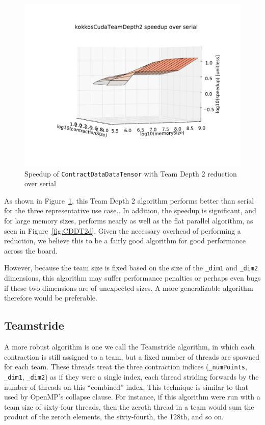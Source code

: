 \begin{figure}[ht]
    \includegraphics[width=5in]{./VersusSerial_kokkosCudaTeamDepth2_clearCache_shadowfax}
    \caption[Performance of \texttt{ContractDataDataTensor} Team Depth
    2]{Speedup of \texttt{ContractDataDataTensor} with Team Depth 2 reduction
    over serial
\label{fig:ContractDataDataTensorDepth2}} 
\end{figure}

As shown in Figure~\ref{fig:ContractDataDataTensorDepth2}, this Team Depth 2
algorithm performs better than serial for the three representative use case..
In addition, the speedup is significant, and for large memory sizes, performs
nearly as well as the flat parallel algorithm, as seen in
Figure~\ref{fig:CDDT2d}.  Given the necessary overhead of
performing a reduction, we believe this to be a fairly good algorithm for good
performance across the
board.

However, because the team size is fixed based on the size of the \texttt{\_dim1}
and \texttt{\_dim2} dimensions, this algorithm may suffer performance penalties
or perhaps even bugs if these two dimensions are of unexpected sizes.  A more
generalizable algorithm therefore would be preferable.

\subsection{Teamstride}\label{sec:Teamstride}
    A more robust algorithm is one we call the Teamstride algorithm, in which
    each contraction is still assigned to a team, but a fixed number of threads
    are spawned for each team.  These threads treat the three contraction
    indices (\texttt{\_numPoints}, \texttt{\_dim1}, \texttt{\_dim2}) as if they were
    a single index, each thread striding forwards by the number of threads on
    this ``combined'' index.  This technique is similar to that used by OpenMP's
    collapse clause.  For instance, if this algorithm were run with a team size
    of sixty-four threads, then the zeroth thread in a team would sum the
    product of the zeroth elements, the sixty-fourth, the 128th, and so on.
    
